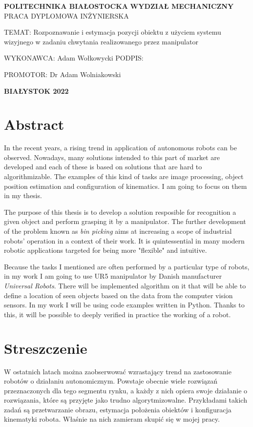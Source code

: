 \documentclass{article}
\newcommand\filling[1][4cm]{\makebox[#1]{\dotfill}}
\begin{document}
\begin{center}
\huge{\textbf{POLITECHNIKA BIAŁOSTOCKA}} 
\vfill
\Large{\textbf{WYDZIAŁ MECHANICZNY}} 
\vfill
\huge{PRACA DYPLOMOWA INŻYNIERSKA}
\vfill
\end{center}

\LARGE{TEMAT: Rozpoznawanie i estymacja pozycji obiektu z użyciem systemu wizyjnego w zadaniu chwytania realizowanego przez manipulator}
\vfill
\begin{flushright}
\Large{WYKONAWCA: Adam Wołkowycki}
\vfill
PODPIS: \filling[4cm]
\vfill
\end{flushright}
\Large{PROMOTOR: Dr Adam Wolniakowski}
\vfill

\begin{center}
\Large{\textbf{BIAŁYSTOK 2022}}
\end{center}
\thispagestyle{empty}

\newpage
\section*{\LARGE{Abstract}}
In the recent years, a rising trend in application of autonomous robots can be observed. Nowadays, many solutions intended to this part of market are developed and each of these is based on solutions that are hard to algorithmizable. The examples of this kind of tasks are image processing, object position estimation and configuration of kinematics. I am going to focus on them in my thesis.

The purpose of this thesis is to develop a solution resposible for recognition a given object and perform grasping it by a manipulator. The further development of the problem known as \emph{bin picking} aims at increasing a scope of industrial robots' operation in a context of their work. It is quintessential in many modern robotic applications targeted for being more "flexible" and intuitive.

Because the tasks I mentioned are often performed by a particular type of robots, in my work I am going to use UR5 manipulator by Danish manufacturer \emph{Universal Robots}. There will be implemented algorithm on it that will be able to define a location of seen objects based on the data from the computer vision sensors. In my work I will be using code examples written in Python. Thanks to this, it will be possible to deeply verified in practice the working of a robot.

\newpage
\section*{\LARGE{Streszczenie}}
W ostatnich latach można zaobserwować wzrastający trend na zastosowanie robotów o działaniu autonomicznym. Powstaje obecnie wiele rozwiązań przeznaczonych dla tego segmentu rynku, a każdy z nich opiera swoje działanie o rozwiązania, które są przyjęte jako trudno algorytmizowalne. Przykładami takich zadań są przetwarzanie obrazu, estymacja położenia obiektów i konfiguracja kinematyki robota. Właśnie na nich zamieram skupić się w mojej pracy.
\end{document}
